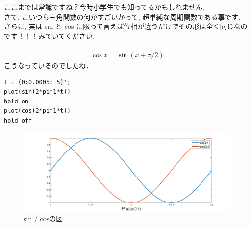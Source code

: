 \documentclass[11pt,a4paper]{jreport}
\begin{document}
ここまでは常識ですね？今時小学生でも知ってるかもしれません.\\

さて, こいつら三角関数の何がすごいかって, 超単純な周期関数である事です. \\

さらに, 実は sin と cos に限って言えば位相が違うだけでその形は全く同じなのです！！！みていてください.\\
\\
\begin{eqnarray}
\cos x = \sin (x + \pi/2)
\end{eqnarray}
こうなっているのでしたね．
\\

\begin{lstlisting}[caption=三角関数のMATLABコード,label=sc:tri]
t = (0:0.0005: 5)';
plot(sin(2*pi*1*t))
hold on
plot(cos(2*pi*1*t))
hold off
\end{lstlisting}


\begin{figure}[H]
\label{im:sincos}
  \centering
  \includegraphics[width=360mm,bb=0 0 1700 300]{../figures/sincos.png}
  \caption{sin / cosの図}
\end{figure}
\end{document}
